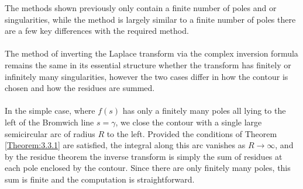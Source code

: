 The methods shown previously only contain a finite number of poles and or singularities, while the method is largely similar to a finite number of poles there are a few key differences with the required method.
\\
\\
The method of inverting the Laplace transform via the complex inversion formula remains the same in its essential structure whether the transform has finitely or infinitely many singularities, however the two cases differ in how the contour is chosen and how the residues are summed.
\\
\\
In the simple case, where $f(s)$ has only a finitely many poles all lying to the left of the Bromwich line $s = \gamma$, we close the contour with a single large semicircular arc of radius $R$ to the left. Provided the conditions of Theorem \ref{Theorem:3.3.1} are satisfied, the integral along this arc vanishes as $R \to \infty$, and by the residue theorem the inverse transform is simply the sum of residues at each pole enclosed by the contour. Since there are only finitely many poles, this sum is finite and the computation is straightforward.
\\
